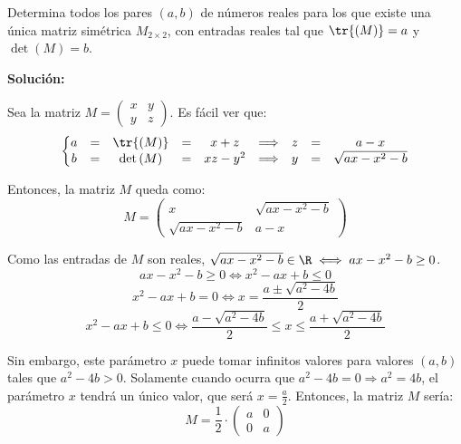 \documentclass[../../main.tex]{subfiles}
\begin{document}
  \begin{shaded}
    Determina todos los pares $(a, b)$ de números reales para los que existe una única matriz simétrica $M_{2 \times 2}$, con entradas reales tal que $\tr{(M)} = a$ y $\det{(M)} = b$.
  \end{shaded}

  \textbf{Solución:}

  Sea la matriz $M = \left(\begin{matrix}x & y \\ y & z\end{matrix}\right)$. Es fácil ver que:
  $$
  \left\{
    \begin{matrix}
      a & = & \tr{(M)} & = & x + z & \Longrightarrow & z & = & a - x \\
      b & = & \det{(M)} & = & xz - y^2 & \Longrightarrow & y & = & \sqrt{ax - x^2 - b}
    \end{matrix}
  \right .
  $$

  Entonces, la matriz $M$ queda como:
  $$
  M = \left(
    \begin{matrix}
      x & \sqrt{ax - x^2 - b} \\
      \sqrt{ax - x^2 - b} & a - x
    \end{matrix}
  \right)
  $$

  Como las entradas de $M$ son reales, $\sqrt{ax - x^2 - b} \in \R \iff ax - x^2 - b \geq 0$.
  $$
  ax - x^2 - b \geq 0 \iff x^2 - ax + b \leq 0
  $$
  $$
  x^2 - ax + b = 0 \iff x = \frac{a \pm \sqrt{a^2 - 4b}}{2}
  $$
  $$
  x^2 - ax + b \leq 0 \iff \frac{a - \sqrt{a^2 - 4b}}{2} \leq x \leq \frac{a + \sqrt{a^2 - 4b}}{2}
  $$

  Sin embargo, este parámetro $x$ puede tomar infinitos valores para valores $(a, b)$ tales que $a^2 - 4b > 0$. Solamente cuando ocurra que $a^2 - 4b = 0 \Longrightarrow a^2 = 4b$, el parámetro $x$ tendrá un único valor, que será $x = \displaystyle\frac{a}{2}$. Entonces, la matriz $M$ sería:
  $$
  M = \frac{1}{2} \cdot \left(\begin{matrix}a & 0 \\ 0 & a\end{matrix}\right)
  $$
\end{document}
